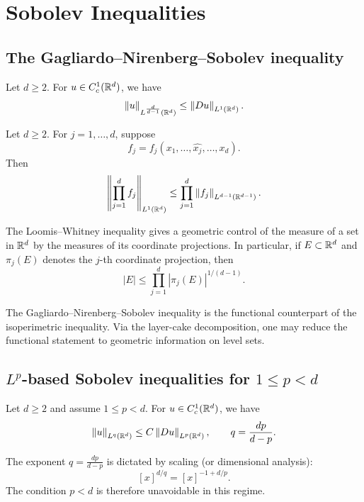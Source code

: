 \section{Sobolev Inequalities}

\subsection{The Gagliardo--Nirenberg--Sobolev inequality}

\begin{theorem}
Let $d \ge 2$. For $u \in C_c^1(\mathbb{R}^d)$, we have
\[
\left\lVert u \right\rVert_{L^{\frac{d}{d-1}}(\mathbb{R}^d)} \le \left\lVert Du \right\rVert_{L^1(\mathbb{R}^d)}.
\]
\end{theorem}

\begin{lemma}
Let $d \ge 2$. For $j=1,\dots,d$, suppose
\[
f_j=f_j(x_1,\dots,\widehat{x_j},\dots,x_d).
\]
Then
\[
\left\| \prod_{j=1}^d f_j \right\|_{L^1(\mathbb{R}^d)}
\le
\prod_{j=1}^d \left\lVert f_j \right\rVert_{L^{d-1}(\mathbb{R}^{d-1})}.
\]
\end{lemma}

\begin{remark}
The Loomis--Whitney inequality gives a geometric control of the measure of a set in $\mathbb{R}^d$ by the measures of its coordinate projections. In particular, if $E\subset \mathbb{R}^d$ and $\pi_j(E)$ denotes the $j$-th coordinate projection, then
\[
|E| \le \prod_{j=1}^d |\pi_j(E)|^{1/(d-1)}.
\]
\end{remark}

\begin{remark}
The Gagliardo--Nirenberg--Sobolev inequality is the functional counterpart of the isoperimetric inequality. Via the layer-cake decomposition, one may reduce the functional statement to geometric information on level sets.
\end{remark}

\subsection{$L^p$-based Sobolev inequalities for $1 \le p < d$}

\begin{theorem}
Let $d \ge 2$ and assume $1\le p<d$. For $u\in C_c^1(\mathbb{R}^d)$, we have
\[
\left\lVert u \right\rVert_{L^q(\mathbb{R}^d)} \le C\left\lVert Du \right\rVert_{L^p(\mathbb{R}^d)},
\qquad q=\frac{dp}{d-p}.
\]
\end{theorem}

\begin{remark}
The exponent $q=\frac{dp}{d-p}$ is dictated by scaling (or dimensional analysis):
\[
[x]^{d/q}=[x]^{-1+d/p}.
\]
The condition $p<d$ is therefore unavoidable in this regime.
\end{remark}

